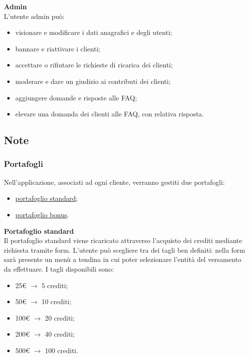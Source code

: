 \documentclass[a4paper, 14pt]{article}
\begin{document}
\begin{flushleft}
			\bigskip \textbf{Admin} \\ \smallskip
			L'utente admin può:
			\begin{itemize}
				\item visionare e modificare i dati anagrafici e degli utenti;
				\item bannare e riattivare i clienti;
				\item accettare o rifiutare le richieste di ricarica dei clienti;
				\item moderare e dare un giudizio ai contributi dei clienti;
				\item aggiungere domande e risposte alle FAQ;
				\item elevare una domanda dei clienti alle FAQ, con relativa risposta.
			\end{itemize}
		
			\subsection{Note}
			\subsubsection{Portafogli} \label{Portafogli}
				Nell'applicazione, associati ad ogni cliente, verranno gestiti due portafogli:
				\begin{itemize}
					\item \underline{portafoglio standard};
					\item \underline{portafoglio bonus}.
				\end{itemize}

				\bigskip \textbf{Portafoglio standard} \\ \smallskip \label{PortSTD}			
				Il portafoglio standard viene ricaricato attraverso l’acquisto dei crediti mediante richiesta tramite form.
				L’utente può scegliere tra dei tagli ben definiti: nella form sarà presente un menù a tendina in cui poter selezionare l'entità del versamento da effettuare.
				I tagli disponibili sono:
				\begin{itemize}
					\item 25\euro \> $\rightarrow$ 5 crediti;
					\item 50\euro \> $\rightarrow$ 10 crediti;
					\item 100\euro \> $\rightarrow$ 20 crediti;
					\item 200\euro \> $\rightarrow$ 40 crediti;
					\item 500\euro \> $\rightarrow$ 100 crediti.
				\end{itemize}
				

\end{flushleft}
\end{document}
